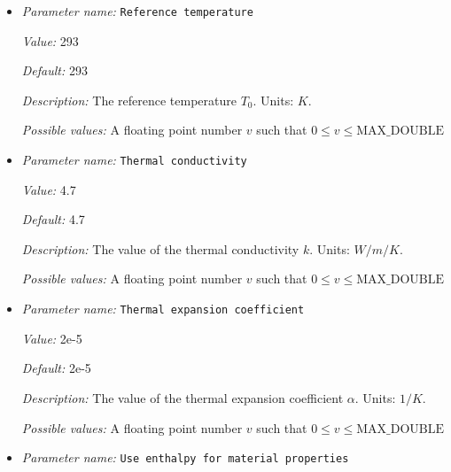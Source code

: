 \begin{itemize}
{\it Default:} 1250


{\it Description:} The value of the specific heat $cp$. Units: $J/kg/K$.


{\it Possible values:} A floating point number $v$ such that $0 \leq v \leq \text{MAX\_DOUBLE}$
\item {\it Parameter name:} {\tt Reference temperature}
\label{parameters:Material model/Grain size model/Reference temperature}
\label{parameters:Material_20model/Grain_20size_20model/Reference_20temperature}


{\it Value:} 293


{\it Default:} 293


{\it Description:} The reference temperature $T_0$. Units: $K$.


{\it Possible values:} A floating point number $v$ such that $0 \leq v \leq \text{MAX\_DOUBLE}$
\item {\it Parameter name:} {\tt Thermal conductivity}
\label{parameters:Material model/Grain size model/Thermal conductivity}
\label{parameters:Material_20model/Grain_20size_20model/Thermal_20conductivity}


{\it Value:} 4.7


{\it Default:} 4.7


{\it Description:} The value of the thermal conductivity $k$. Units: $W/m/K$.


{\it Possible values:} A floating point number $v$ such that $0 \leq v \leq \text{MAX\_DOUBLE}$
\item {\it Parameter name:} {\tt Thermal expansion coefficient}
\label{parameters:Material model/Grain size model/Thermal expansion coefficient}
\label{parameters:Material_20model/Grain_20size_20model/Thermal_20expansion_20coefficient}


{\it Value:} 2e-5


{\it Default:} 2e-5


{\it Description:} The value of the thermal expansion coefficient $\alpha$. Units: $1/K$.


{\it Possible values:} A floating point number $v$ such that $0 \leq v \leq \text{MAX\_DOUBLE}$
\item {\it Parameter name:} {\tt Use enthalpy for material properties}
\label{parameters:Material model/Grain size model/Use enthalpy for material properties}
\label{parameters:Material_20model/Grain_20size_20model/Use_20enthalpy_20for_20material_20properties}



\end{itemize}
